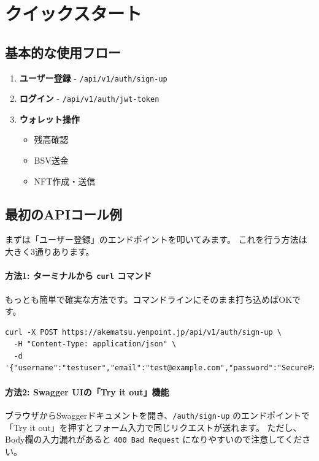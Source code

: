 \documentclass[11pt,a4paper]{ltjsarticle}  %
\begin{document}
\section{クイックスタート}

\subsection{基本的な使用フロー}

\begin{enumerate}
    \item \textbf{ユーザー登録} - \texttt{/api/v1/auth/sign-up}
    \item \textbf{ログイン} - \texttt{/api/v1/auth/jwt-token}
    \item \textbf{ウォレット操作}
    \begin{itemize}
        \item 残高確認
        \item BSV送金
        \item NFT作成・送信
    \end{itemize}
\end{enumerate}
\subsection{最初のAPIコール例}

まずは「ユーザー登録」のエンドポイントを叩いてみます。
これを行う方法は大きく3通りあります。

\paragraph{方法1: ターミナルから \texttt{curl} コマンド}
もっとも簡単で確実な方法です。コマンドラインにそのまま打ち込めばOKです。

\begin{lstlisting}[style=bashStyle]
curl -X POST https://akematsu.yenpoint.jp/api/v1/auth/sign-up \
  -H "Content-Type: application/json" \
  -d '{"username":"testuser","email":"test@example.com","password":"SecurePassword123!"}'
\end{lstlisting}

\paragraph{方法2: Swagger UIの「Try it out」機能}
ブラウザからSwaggerドキュメントを開き、\texttt{/auth/sign-up} のエンドポイントで
「Try it out」を押すとフォーム入力で同じリクエストが送れます。
ただし、Body欄の入力漏れがあると \texttt{400 Bad Request} になりやすいので注意してください。
\end{document}
